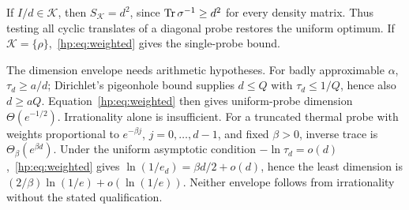 If $I/d\in\mathcal K$, then $S_{\mathcal K}=d^2$, since $\operatorname{Tr}\sigma^{-1}\ge d^2$ for every density matrix. Thus testing all cyclic translates of a diagonal probe restores the uniform optimum. If $\mathcal K=\{\rho\}$,~\eqref{hp:eq:weighted} gives the single-probe bound.

The dimension envelope needs arithmetic hypotheses. For badly approximable $\alpha$, $\tau_d\ge a/d$; Dirichlet's pigeonhole bound supplies $d\le Q$ with $\tau_d\le1/Q$, hence also $d\ge aQ$. Equation~\eqref{hp:eq:weighted} then gives uniform-probe dimension $\Theta(e^{-1/2})$. Irrationality alone is insufficient. For a truncated thermal probe with weights proportional to $e^{-\beta j}$, $j=0,\ldots,d-1$, and fixed $\beta>0$, inverse trace is $\Theta_\beta(e^{\beta d})$. Under the uniform asymptotic condition $-\ln\tau_d=o(d)$,~\eqref{hp:eq:weighted} gives $\ln(1/e_d)=\beta d/2+o(d)$, hence the least dimension is $(2/\beta)\ln(1/e)+o(\ln(1/e))$. Neither envelope follows from irrationality without the stated qualification.
